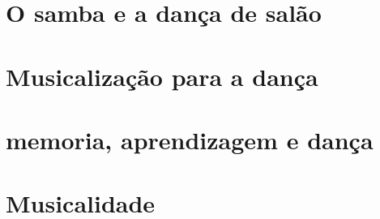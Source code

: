 \documentclass[12pt]{extbook} %
\begin{document}
\part{O samba e a dança de salão}




\part{Musicalização para a dança}





\part{memoria, aprendizagem e dança}


\part{Musicalidade}



\end{document}
